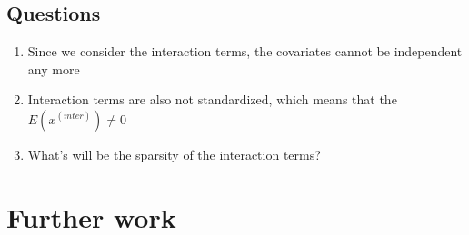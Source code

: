 \documentclass[]{article}
\providecommand{\tightlist}{%
  \setlength{\itemsep}{0pt}\setlength{\parskip}{0pt}}
\begin{document}
\subsection{Questions}\label{questions}

\begin{enumerate}
\def\labelenumi{\arabic{enumi}.}
\tightlist
\item
  Since we consider the interaction terms, the covariates cannot be
  independent any more
\item
  Interaction terms are also not standardized, which means that the
  \(E(x^{(inter)}) \neq 0\)
\item
  What's will be the sparsity of the interaction terms?
\end{enumerate}

\section{Further work}\label{further-work}
\end{document}
